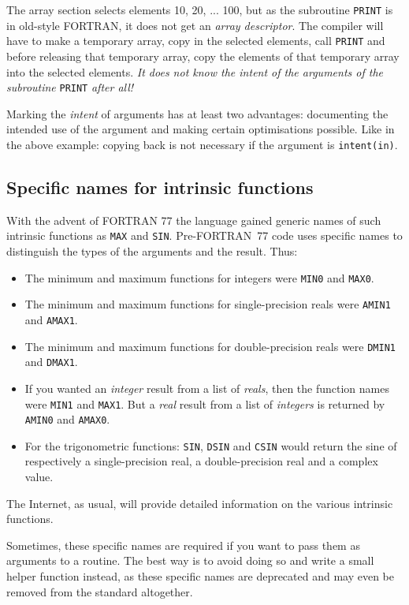 The array section selects elements 10, 20, ... 100, but as the subroutine \verb+PRINT+
is in old-style FORTRAN, it does not get an \emph{array descriptor}. The compiler
will have to make a temporary array, copy in the selected elements, call \verb+PRINT+
and before releasing that temporary array, copy the elements of that temporary
array into the selected elements. \emph{It does not know the intent of the arguments
of the subroutine} \verb+PRINT+ \emph{after all!}

Marking the \emph{intent} of arguments has at least two advantages:
documenting the intended use of the argument and making certain optimisations
possible. Like in the above example: copying back is not necessary if the argument
is \verb+intent(in)+.


\subsection{Specific names for intrinsic functions}
With the advent of FORTRAN 77 the language gained generic names of such intrinsic
functions as \verb+MAX+ and \verb+SIN+. Pre-FORTRAN~77 code uses specific names
to distinguish the types of the arguments and the result. Thus:
\begin{itemize}
\item
The minimum and maximum functions for integers were \verb+MIN0+ and \verb+MAX0+.
\item
The minimum and maximum functions for single-precision reals were \verb+AMIN1+ and \verb+AMAX1+.
\item
The minimum and maximum functions for double-precision reals were \verb+DMIN1+ and \verb+DMAX1+.
\item
If you wanted an \emph{integer} result from a list of \emph{reals}, then the function names
were \verb+MIN1+ and \verb+MAX1+. But a \emph{real} result from a list of \emph{integers}
is returned by \verb+AMIN0+ and \verb+AMAX0+.
\item
For the trigonometric functions: \verb+SIN+, \verb+DSIN+ and \verb+CSIN+ would return
the sine of respectively a single-precision real, a double-precision real and a complex value.
\end{itemize}

The Internet, as usual, will provide detailed information on the various intrinsic functions.

Sometimes, these specific names are required if you want to pass them as arguments to a
routine. The best way is to avoid doing so and write a small helper function instead,
as these specific names are deprecated and may even be removed from the standard altogether.

